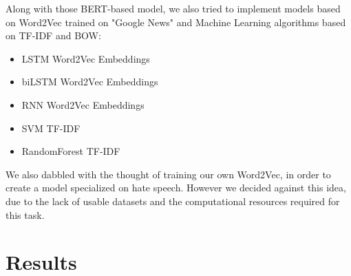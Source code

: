 \documentclass[11pt]{article}
\begin{document}
\begin{enumerate}
	      Along with those BERT-based model, we also tried to implement models based on Word2Vec\cite{goldberg2014word2vec}
	      trained on "Google News" and Machine Learning algorithms based on TF-IDF and BOW:

	      \begin{itemize}
		      \item LSTM Word2Vec Embeddings \cite{staudemeyer2019understanding}
		      \item biLSTM Word2Vec Embeddings \cite{huang2015bidirectional}
		      \item RNN Word2Vec Embeddings \cite{rnn}
		      \item SVM TF-IDF
		      \item RandomForest TF-IDF
	      \end{itemize}



          We also dabbled with the thought of training our own Word2Vec, in
          order to create a model specialized on hate speech. However we
          decided against this idea, due to the lack of usable datasets and the
          computational resources required for this task.


\end{enumerate}


\section{Results}
\end{document}
